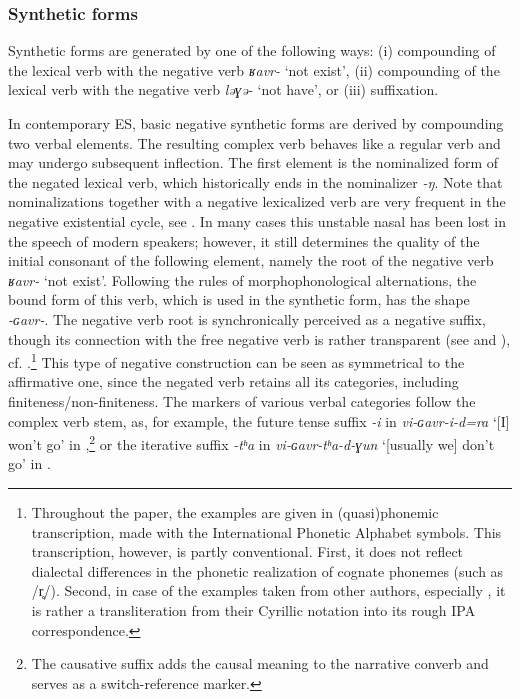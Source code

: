 \documentclass[output=paper,colorlinks,citecolor=brown]{langscibook}
\begin{document}
\subsubsection{Synthetic forms}\label{sec:niv:2.1.1}

Synthetic forms are generated by one of the following ways: (i) compounding of the lexical verb with the negative verb \textit{ʁavr-} ‘not exist’, (ii) compounding of the lexical verb with the negative verb \textit{ləɣə{}-} ‘not have’, or (iii) suffixation.

In contemporary ES, basic negative synthetic forms are derived by compounding two verbal elements. The resulting complex verb behaves like a regular verb and may undergo subsequent inflection. The first element is the nominalized form of the negated lexical verb, which historically ends in the nominalizer \textit{-ŋ}. Note that nominalizations together with a negative lexicalized verb are very frequent in the negative existential cycle, see \citet{Veselinova2014}. 
In many cases this unstable nasal has been lost in the speech of modern speakers; however, it still determines the quality of the initial consonant of the following element, namely the root of the negative verb \textit{ʁavr-} ‘not exist’. Following the rules of morphophonological alternations, the bound form of this verb, which is used in the synthetic form, has the shape \textit{-ɢavr-}. The negative verb root is synchronically perceived as a negative suffix, though its connection with the free negative verb is rather transparent (see  and ), cf. .\footnote{Throughout the paper, the examples are given in (quasi)phonemic transcription, made with the International Phonetic Alphabet symbols. This transcription, however, is partly conventional. First, it does not reflect dialectal differences in the phonetic realization of cognate phonemes (such as /r̥/). Second, in case of the examples taken from other authors, especially \citet{KreinovichMs}, it is rather a transliteration from their Cyrillic notation into its rough IPA correspondence.} This type of negative construction can be seen as symmetrical to the affirmative one, since the negated verb retains all its categories, including finiteness/non-finiteness. The markers of various verbal categories follow the complex verb stem, as, for example, the future tense suffix \textit{-i} in \textit{vi-ɢavr-i-d=ra} ‘[I] won’t go’ in ,\footnote{The causative suffix adds the causal meaning to the narrative converb and serves as a switch-reference marker.} or the iterative suffix \textit{-tʰa} in \textit{vi-ɢavr-tʰa-d-ɣun} ‘[usually we] don’t go’ in .
\end{document}
